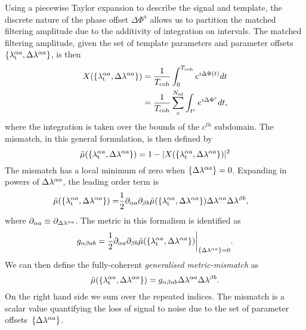 \documentclass[../full_thesis/full_thesis.tex]{subfiles}
\begin{document}
Using a piecewise Taylor expansion
to describe the signal and template, the discrete nature of the phase offset
$\Delta\Phi^{a}$ allows us to partition the matched filtering amplitude due to
the additivity of integration on intervals. The matched filtering amplitude,
given the set of template parameters and parameter offsets $\{{\lambda}_\textrm{t}^{\alpha a},
\Delta\lambda^{\alpha a}\}$, is then
\begin{align}
X(\{{\lambda}_\textrm{t}^{\alpha a}, \Delta\lambda^{\alpha a}\}) & =
\frac{1}{T_{\mathrm{coh}}}\int_{0}^{T_{\mathrm{coh}}}e^{i \Delta \Phi(t)}dt  \\
& =  \frac{1}{T_{\mathrm{coh}}}\sum_{c}^{N_{\textrm{sd}}} \int_{t^{c}}e^{i \Delta \Phi^{c}}dt,
\end{align}
where the integration is taken over the bounds of the $c^{th}$ subdomain. The
mismatch, in this general formulation, is then defined by
\begin{equation}
\tilde{\mu}(\{{\lambda}_\textrm{t}^{\alpha a}, \Delta\lambda^{\alpha a}\}) =
 1 -  |X(\{{\lambda}_\textrm{t}^{\alpha a}, \Delta\lambda^{\alpha a}\})|^{2}
\end{equation}
The mismatch has a local minimum of zero when $\{\Delta\lambda^{\alpha a}\}=0$. Expanding in powers of
$\Delta\lambda^{\alpha a}$, the leading order term is
\begin{align}
\begin{split}
\tilde{\mu}(\{{\lambda}_\textrm{t}^{\alpha a}, \Delta\lambda^{\alpha a}\}) =
 & \frac{1}{2} \partial_{\alpha a} \partial_{\beta b}
                \tilde{\mu}(\{{\lambda}_\textrm{t}^{\alpha a}, \Delta\lambda^{\alpha a}\})
                \Delta\lambda^{\alpha a}\Delta\lambda^{\beta b},
\label{eqn: mismatch expansion}
\end{split}
\end{align}
where $\partial_{\alpha a} \equiv \partial_{\Delta\lambda^{\alpha a}}$.  The metric in
this formalism is identified as
\begin{equation}
g_{\alpha\beta ab} =
\frac{1}{2} \partial_{\alpha a} \partial_{\beta b}
            \tilde{\mu}(\{{\lambda}_\textrm{t}^{\alpha a}, \Delta\lambda^{\alpha a}\})
            \biggr\rvert_{\{\Delta\lambda^{\alpha a}\}=0}.
\end{equation}
We can then define the fully-coherent \emph{generalised metric-mismatch} as
\begin{equation}
\tilde{\mu}(\{{\lambda}_\textrm{t}^{\alpha a}, \Delta\lambda^{\alpha a}\}) =
 g_{\alpha\beta ab} \Delta\lambda^{\alpha a}\Delta\lambda^{\beta b}.
\label{eqn: mismatch}
\end{equation}
On the right hand side we sum over the repeated indices. The mismatch is a
scalar value quantifying the loss of signal to noise due to the set of
parameter offsets~$\{\Delta\lambda^{\alpha a}\}$.
\end{document}
